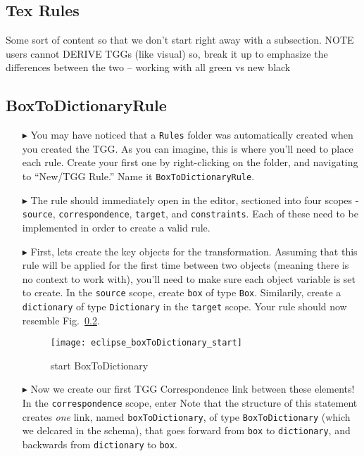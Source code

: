 \newpage
\hypertarget{rules tex}{}
\subsection{Tex Rules}
\texHeader

Some sort of content so that we don't start right away with a subsection. NOTE users cannot DERIVE TGGs (like visual) so, break it up to emphasize the
differences between the two -- working with all green vs new black

\subsection{BoxToDictionaryRule}

\begin{itemize}

\item[$\blacktriangleright$] You may have noticed that a \texttt{Rules} folder was automatically created when you created the TGG. As you can imagine, this is
where you'll need to place each rule. Create your first one by right-clicking on the folder, and navigating to ``New/TGG Rule.'' Name it
\texttt{BoxToDictionaryRule}.

\item[$\blacktriangleright$] The rule should immediately open in the editor, sectioned into four scopes - \texttt{source}, \texttt{correspondence},
\texttt{target}, and \texttt{constraints}. Each of these need to be implemented in order to create a valid rule.

\item[$\blacktriangleright$] First, lets create the key objects for the transformation. Assuming that this rule will be applied for the first time between two
objects (meaning there is no context to work with), you'll need to make sure each object variable is set to create. In the \texttt{source} scope, create
\texttt{box} of type \texttt{Box}. Similarily, create a \texttt{dictionary} of type \texttt{Dictionary} in the \texttt{target} scope. Your rule should now
resemble Fig.~\ref{}.

\begin{figure}[htbp]
\begin{center}
  \texttt{[image: eclipse\_boxToDictionary\_start]}
  \caption{start BoxToDictionary}
  \label{fig:textSourceRule}
\end{center}
\end{figure}

\item[$\blacktriangleright$] Now we create our first TGG Correspondence link between these elements! In the \texttt{correspondence} scope, enter 
Note that the structure of this statement creates \emph{one} link, named \texttt{boxToDictionary}, of type \texttt{BoxToDictionary} (which we delcared in the
schema), that goes forward from \texttt{box} to \texttt{dictionary}, and backwards from \texttt{dictionary} to \texttt{box}.


\end{itemize}
